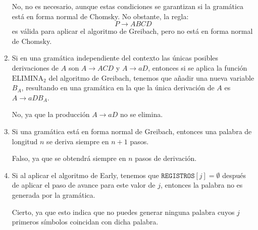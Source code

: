\documentclass[12pt]{article}
\begin{document}
\begin{ejercicio}[2.5 puntos]
\begin{enumerate}
            No, no es necesario, aunque estas condiciones se garantizan si la gramática está en forma normal de Chomsky. No obstante, la regla:
            \begin{equation*}
                P\rightarrow ABCD
            \end{equation*}
            es válida para aplicar el algoritmo de Greibach, pero no está en forma normal de Chomsky.
            \item Si en una gramática independiente del contexto las únicas posibles derivaciones de $A$ son $A \to ACD$ y $A \to aD$, entonces si se aplica la función $\text{ELIMINA}_2$ del algoritmo de Greibach, tenemos que añadir una nueva variable $B_A$, resultando en una gramática en la que la única derivación de $A$ es $A \to aDB_A$.
            
            No, ya que la producción $A\rightarrow aD$ no se elimina.
            \item Si una gramática está en forma normal de Greibach, entonces una palabra de longitud $n$ se deriva siempre en $n + 1$ pasos.
            
            Falso, ya que se obtendrá siempre en $n$ pasos de derivación.
            \item Si al aplicar el algoritmo de Early, tenemos que $\texttt{REGISTROS}[j] = \emptyset$ después de aplicar el paso de avance para este valor de $j$, entonces la palabra no es generada por la gramática.
            
            Cierto, ya que esto indica que no puedes generar ninguna palabra cuyos $j$ primeros símbolos coincidan con dicha palabra.
        \end{enumerate}
    \end{ejercicio}
\end{document}
